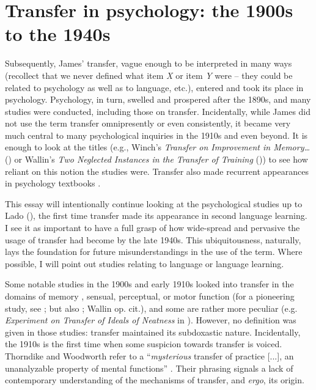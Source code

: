 \documentclass{article}
\begin{document}
\section{Transfer in psychology: the 1900s to the 1940s}

Subsequently, James’ transfer, vague enough to be interpreted in many ways (recollect that we never defined what item \textit{X} or item \textit{Y} were -- they could be related to psychology as well as to language, etc.), entered and took its place in psychology. Psychology, in turn, swelled and prospered after the 1890s, and many studies were conducted, including those on transfer. Incidentally, while James did not use the term transfer omnipresently or even consistently, it became very much central to many psychological inquiries in the 1910s and even beyond. It is enough to look at the titles (e.g., Winch’s \textit{Transfer on Improvement in Memory…} (\citeyear{winch_transfer_1908}) or Wallin’s \textit{Two Neglected Instances in the Transfer of Training} (\citeyear{wallin_two_1910})) to see how reliant on this notion the studies were. Transfer also made recurrent appearances in psychology textbooks \citep[][e.g.,]{wheeler_science_1929}. 

This essay will intentionally continue looking at the psychological studies up to Lado (\citeyear{lado_relation_1949}), the first time transfer made its appearance in second language learning. I see it as important to have a full grasp of how wide-spread and pervasive the usage of transfer had become by the late 1940s. This ubiquitousness, naturally, lays the foundation for future misunderstandings in the use of the term. Where possible, I will point out studies relating to language or language learning. 

Some notable studies in the 1900s and early 1910s looked into transfer in the domains of memory \citep{winch_transfer_1908, dearborn_experiments_1910, peterson_note_1912, fracker_transference_1907}, sensual, perceptual, or motor function (for a pioneering study, see \cite{woodworth_influence_1901}; but also \cite{scholkov_relation_1908}; Wallin op. cit.), and some are rather more peculiar (e.g. \textit{Experiment on Transfer of Ideals of Neatness} in \cite{bagley_experiment_1905}). However, no definition was given in those studies: transfer maintained its subdoxastic nature. Incidentally, the 1910s is the first time when some suspicion towards transfer is voiced. Thorndike and Woodworth refer to a ``\textit{mysterious} transfer of practice [...], an unanalyzable property of mental functions'' \citep[][p. 256, emphasis added]{woodworth_influence_1901}. Their phrasing signals a lack of contemporary understanding of the mechanisms of transfer, and \textit{ergo}, its origin. 
\end{document}
